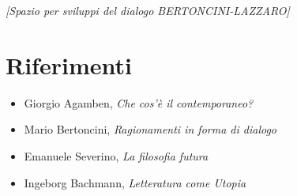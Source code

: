 \documentclass[12pt,a4paper]{article}
\begin{document}
\vspace{2cm}
\textit{[Spazio per sviluppi del dialogo BERTONCINI-LAZZARO]}

\vspace{5cm}

\section*{Riferimenti}

\begin{itemize}
\item Giorgio Agamben, \textit{Che cos'è il contemporaneo?}
\item Mario Bertoncini, \textit{Ragionamenti in forma di dialogo}
\item Emanuele Severino, \textit{La filosofia futura}
\item Ingeborg Bachmann, \textit{Letteratura come Utopia}
\end{itemize}
\end{document}
